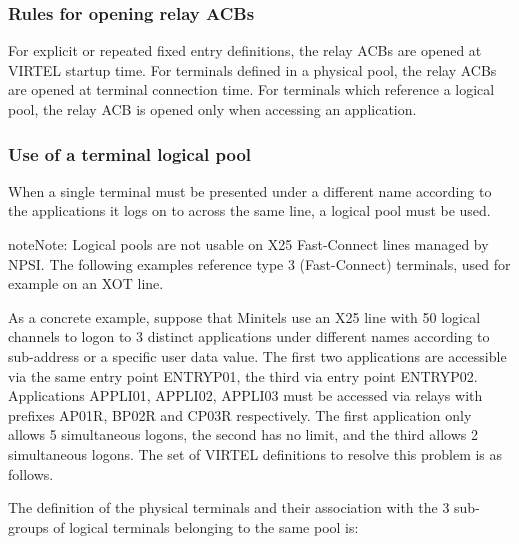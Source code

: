 \documentclass[letterpaper,10pt,english]{sphinxmanual}
\begin{document}
\subsubsection{Rules for opening relay ACBs}
\label{\detokenize{connectivity_guide:rules-for-opening-relay-acbs}}
For explicit or repeated fixed entry definitions, the relay ACBs are opened at VIRTEL startup time. For terminals defined in a physical pool, the relay ACBs are opened at terminal connection time. For terminals which reference a logical pool, the relay ACB is opened only when accessing an application.


\subsubsection{Use of a terminal logical pool}
\label{\detokenize{connectivity_guide:use-of-a-terminal-logical-pool}}
When a single terminal must be presented under a different name according to the applications it logs on to across the same line, a logical pool must be used.

\begin{sphinxadmonition}{note}{Note:}
Logical pools are not usable on X25 Fast-Connect lines managed by NPSI. The following examples reference type 3 (Fast-Connect) terminals, used for example on an XOT line.
\end{sphinxadmonition}

As a concrete example, suppose that Minitels use an X25 line with 50 logical channels to logon to 3 distinct applications under different names according to sub-address or a specific user data value. The first two applications are accessible via the same entry point ENTRYP01, the third via entry point ENTRYP02. Applications APPLI01, APPLI02, APPLI03 must be accessed via relays with prefixes AP01R, BP02R and CP03R respectively. The first application only allows 5 simultaneous logons, the second has no limit, and the third allows 2 simultaneous logons. The set of VIRTEL definitions to resolve this problem is as follows.


The definition of the physical terminals and their association with the 3 sub-groups of logical terminals belonging to the same pool is:
\end{document}
